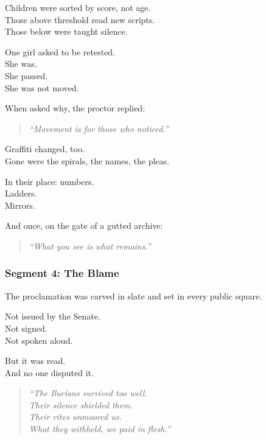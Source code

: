 \documentclass[9pt]{article}
\begin{document}
Children were sorted by score, not age.\\
Those above threshold read new scripts.\\
Those below were taught silence.

One girl asked to be retested.\\
She was.\\
She passed.\\
She was not moved.

When asked why, the proctor replied:

\begin{quote}
\textit{“Movement is for those who noticed.”}
\end{quote}

\vspace{1em}

Graffiti changed, too.\\
Gone were the spirals, the names, the pleas.

In their place: numbers.\\
Ladders.\\
Mirrors.

And once, on the gate of a gutted archive:

\begin{quote}
\textit{“What you see is what remains.”}
\end{quote}

\newpage

\subsubsection*{Segment 4: The Blame}

The proclamation was carved in slate and set in every public square.

Not issued by the Senate.\\
Not signed.\\
Not spoken aloud.

But it was read.\\
And no one disputed it.

\begin{quote}
\textit{“The Ilurians survived too well.}\\
\textit{Their silence shielded them.}\\
\textit{Their rites unmoored us.}\\
\textit{What they withheld, we paid in flesh.”}
\end{quote}

\vspace{1em}
\end{document}
